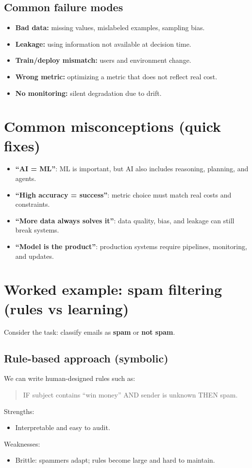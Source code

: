 \documentclass[11pt]{article}
\begin{document}
\subsection{Common failure modes}
\begin{itemize}[leftmargin=*]
  \item \textbf{Bad data:} missing values, mislabeled examples, sampling bias.
  \item \textbf{Leakage:} using information not available at decision time.
  \item \textbf{Train/deploy mismatch:} users and environment change.
  \item \textbf{Wrong metric:} optimizing a metric that does not reflect real cost.
  \item \textbf{No monitoring:} silent degradation due to drift.
\end{itemize}

\section{Common misconceptions (quick fixes)}
\begin{itemize}[leftmargin=*]
  \item \textbf{``AI = ML''}: ML is important, but AI also includes reasoning, planning, and agents.
  \item \textbf{``High accuracy = success''}: metric choice must match real costs and constraints.
  \item \textbf{``More data always solves it''}: data quality, bias, and leakage can still break systems.
  \item \textbf{``Model is the product''}: production systems require pipelines, monitoring, and updates.
\end{itemize}

\section{Worked example: spam filtering (rules vs learning)}
Consider the task: classify emails as \textbf{spam} or \textbf{not spam}.

\subsection{Rule-based approach (symbolic)}
We can write human-designed rules such as:
\begin{quote}
IF subject contains ``win money'' AND sender is unknown THEN spam.
\end{quote}
Strengths:
\begin{itemize}[leftmargin=*]
  \item Interpretable and easy to audit.
\end{itemize}
Weaknesses:
\begin{itemize}[leftmargin=*]
  \item Brittle: spammers adapt; rules become large and hard to maintain.
\end{itemize}
\end{document}

